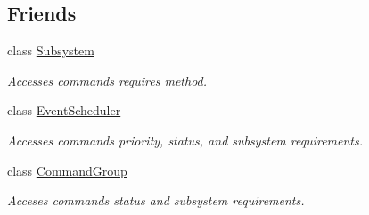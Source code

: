 \subsection*{Friends}
\begin{DoxyCompactItemize}
\item 
\mbox{\label{classlib_iterative_robot_1_1_command_a9b67dc4c93b18626e753aa0938abbf7d}} 
class \mbox{\hyperlink{classlib_iterative_robot_1_1_command_a9b67dc4c93b18626e753aa0938abbf7d}{Subsystem}}
\begin{DoxyCompactList}\small\item\em Accesses commands\textquotesingle{} requires method. \end{DoxyCompactList}\item 
\mbox{\label{classlib_iterative_robot_1_1_command_a2a47195be57876de9e0c9e18467a34a3}} 
class \mbox{\hyperlink{classlib_iterative_robot_1_1_command_a2a47195be57876de9e0c9e18467a34a3}{Event\+Scheduler}}
\begin{DoxyCompactList}\small\item\em Accesses commands\textquotesingle{} priority, status, and subsystem requirements. \end{DoxyCompactList}\item 
\mbox{\label{classlib_iterative_robot_1_1_command_a74a5eec0a51871fda0db6a47a7eae304}} 
class \mbox{\hyperlink{classlib_iterative_robot_1_1_command_a74a5eec0a51871fda0db6a47a7eae304}{Command\+Group}}
\begin{DoxyCompactList}\small\item\em Acceses commands\textquotesingle{} status and subsystem requirements. \end{DoxyCompactList}\end{DoxyCompactItemize}


